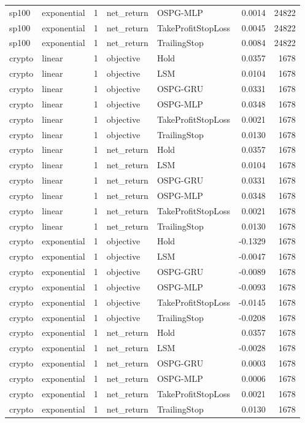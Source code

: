 \begin{longtable}{llrllrr}
sp100 & exponential & 1 & net\_return & OSPG-MLP & 0.0014 & 24822 \\
sp100 & exponential & 1 & net\_return & TakeProfitStopLoss & 0.0045 & 24822 \\
sp100 & exponential & 1 & net\_return & TrailingStop & 0.0084 & 24822 \\
crypto & linear & 1 & objective & Hold & 0.0357 & 1678 \\
crypto & linear & 1 & objective & LSM & 0.0104 & 1678 \\
crypto & linear & 1 & objective & OSPG-GRU & 0.0331 & 1678 \\
crypto & linear & 1 & objective & OSPG-MLP & 0.0348 & 1678 \\
crypto & linear & 1 & objective & TakeProfitStopLoss & 0.0021 & 1678 \\
crypto & linear & 1 & objective & TrailingStop & 0.0130 & 1678 \\
crypto & linear & 1 & net\_return & Hold & 0.0357 & 1678 \\
crypto & linear & 1 & net\_return & LSM & 0.0104 & 1678 \\
crypto & linear & 1 & net\_return & OSPG-GRU & 0.0331 & 1678 \\
crypto & linear & 1 & net\_return & OSPG-MLP & 0.0348 & 1678 \\
crypto & linear & 1 & net\_return & TakeProfitStopLoss & 0.0021 & 1678 \\
crypto & linear & 1 & net\_return & TrailingStop & 0.0130 & 1678 \\
crypto & exponential & 1 & objective & Hold & -0.1329 & 1678 \\
crypto & exponential & 1 & objective & LSM & -0.0047 & 1678 \\
crypto & exponential & 1 & objective & OSPG-GRU & -0.0089 & 1678 \\
crypto & exponential & 1 & objective & OSPG-MLP & -0.0093 & 1678 \\
crypto & exponential & 1 & objective & TakeProfitStopLoss & -0.0145 & 1678 \\
crypto & exponential & 1 & objective & TrailingStop & -0.0208 & 1678 \\
crypto & exponential & 1 & net\_return & Hold & 0.0357 & 1678 \\
crypto & exponential & 1 & net\_return & LSM & -0.0028 & 1678 \\
crypto & exponential & 1 & net\_return & OSPG-GRU & 0.0003 & 1678 \\
crypto & exponential & 1 & net\_return & OSPG-MLP & 0.0006 & 1678 \\
crypto & exponential & 1 & net\_return & TakeProfitStopLoss & 0.0021 & 1678 \\
crypto & exponential & 1 & net\_return & TrailingStop & 0.0130 & 1678 \\
\end{longtable}
